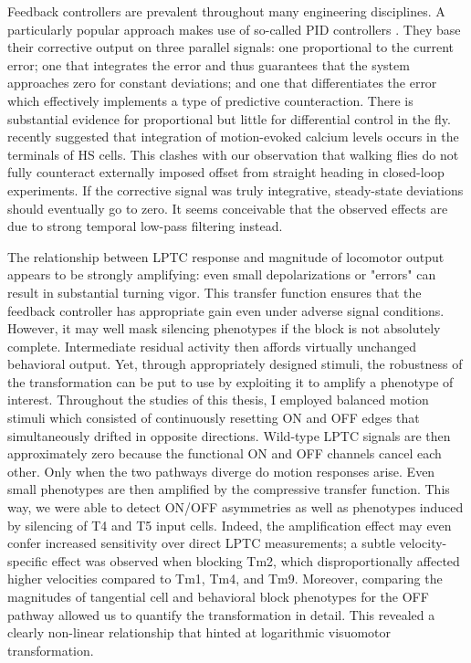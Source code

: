 Feedback controllers are prevalent throughout many engineering disciplines. A particularly popular approach makes use of so-called PID controllers \citep{Astrom:2008aa}. They base their corrective output on three parallel signals: one proportional to the current error; one that integrates the error and thus guarantees that the system approaches zero for constant deviations; and one that differentiates the error which effectively implements a type of predictive counteraction. There is substantial evidence for proportional but little for differential control in the fly. \citet{Schnell:2014hs} recently suggested that integration of motion-evoked calcium levels occurs in the terminals of HS cells. This clashes with our observation that walking flies do not fully counteract externally imposed offset from straight heading in closed-loop experiments. If the corrective signal was truly integrative, steady-state deviations should eventually go to zero. It seems conceivable that the observed effects are due to strong temporal low-pass filtering instead.


The relationship between LPTC response and magnitude of locomotor output appears to be strongly amplifying: even small depolarizations or "errors" can result in substantial turning vigor. This transfer function ensures that the feedback controller has appropriate gain even under adverse signal conditions. However, it may well mask silencing phenotypes if the block is not absolutely complete. Intermediate residual activity then affords virtually unchanged behavioral output. Yet, through appropriately designed stimuli, the robustness of the transformation can be put to use by exploiting it to amplify a phenotype of interest. Throughout the studies of this thesis, I employed balanced motion stimuli \citep[modified from][]{Clark:2011gw} which consisted of continuously resetting ON and OFF edges that simultaneously drifted in opposite directions. Wild-type LPTC signals are then approximately zero because the functional ON and OFF channels cancel each other. Only when the two pathways diverge do motion responses arise. Even small phenotypes are then amplified by the compressive transfer function. This way, we were able to detect ON/OFF asymmetries as well as phenotypes induced by silencing of T4 and T5 input cells. Indeed, the amplification effect may even confer increased sensitivity over direct LPTC measurements; a subtle velocity-specific effect was observed when blocking Tm2, which disproportionally affected higher velocities compared to Tm1, Tm4, and Tm9. Moreover, comparing the magnitudes of tangential cell and behavioral block phenotypes for the OFF pathway allowed us to quantify the transformation in detail. This revealed a clearly non-linear relationship that hinted at logarithmic visuomotor transformation.

